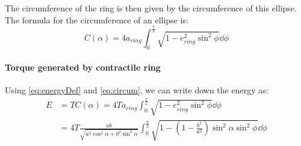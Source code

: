 The circumference of the ring is then given by the circumference of this ellipse. The formula for the circumference of an ellipse is:
\begin{equation} \label{eq:circum}
    C(\alpha) = 4a_{ring}\int_0^{\frac{\pi}{2}} \sqrt{1 - e_{ring}^2\sin^2\phi} \dd{\phi}
\end{equation}

\paragraph{Torque generated by contractile ring}
Using \eqref{eq:energyDef} and \eqref{eq:circum}, we can write down the energy as:
\begin{align*}
    E &= TC(\alpha) = 4Ta_{ring}\int_0^{\frac{\pi}{2}} \sqrt{1 - e_{ring}^2\sin^2\phi} \dd{\phi}\\
    &= 4T\frac{ab}{\sqrt{a^2\cos^2\alpha + b^2\sin^2\alpha}}\int_0^{\frac{\pi}{2}} \sqrt{1 - \left(1 - \frac{b^2}{a^2}\right)\sin^2\alpha\sin^2\phi} \dd{\phi}
\end{align*}

